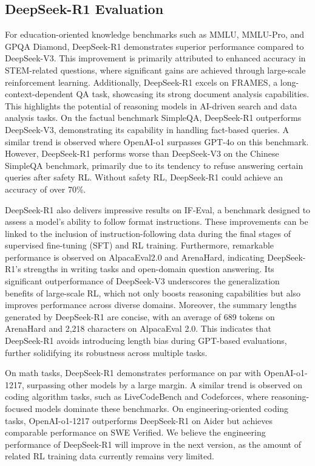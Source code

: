 \documentclass[11pt, a4paper, logo, copyright, nonumbering]{deepseek}
\newcommand{\dsri}{DeepSeek-R1}
\begin{document}
{\subsection{\dsri{} Evaluation}


For education-oriented knowledge benchmarks such as MMLU, MMLU-Pro, and GPQA Diamond, \dsri{} demonstrates superior performance compared to DeepSeek-V3. This improvement is primarily attributed to enhanced accuracy in STEM-related questions, where significant gains are achieved through large-scale reinforcement learning. Additionally, \dsri{} excels on FRAMES, a long-context-dependent QA task, showcasing its strong document analysis capabilities. This highlights the potential of reasoning models in AI-driven search and data analysis tasks. On the factual benchmark SimpleQA, \dsri{} outperforms DeepSeek-V3, demonstrating its capability in handling fact-based queries. A similar trend is observed where OpenAI-o1 surpasses GPT-4o on this benchmark. However, \dsri{} performs worse than DeepSeek-V3 on the Chinese SimpleQA benchmark, primarily due to its tendency to refuse answering certain queries after safety RL. Without safety RL, \dsri{} could achieve an accuracy of over 70\%.


\dsri{} also delivers impressive results on IF-Eval, a benchmark designed to assess a model's ability to follow format instructions. These improvements can be linked to the inclusion of instruction-following data during the final stages of supervised fine-tuning (SFT) and RL training. Furthermore, remarkable performance is observed on AlpacaEval2.0 and ArenaHard, indicating \dsri{}’s strengths in writing tasks and open-domain question answering. Its significant outperformance of DeepSeek-V3 underscores the generalization benefits of large-scale RL, which not only boosts reasoning capabilities but also improves performance across diverse domains.
Moreover, the summary lengths generated by \dsri{} are concise, with an average of 689 tokens on ArenaHard and 2,218 characters on AlpacaEval 2.0. This indicates that \dsri{} avoids introducing length bias during GPT-based evaluations, further solidifying its robustness across multiple tasks.

On math tasks, \dsri{} demonstrates performance on par with OpenAI-o1-1217, surpassing other models by a large margin. A similar trend is observed on coding algorithm tasks, such as LiveCodeBench and Codeforces, where reasoning-focused models dominate these benchmarks. On engineering-oriented coding tasks, OpenAI-o1-1217 outperforms \dsri{} on Aider but achieves comparable performance on SWE Verified. We believe the engineering performance of \dsri{} will improve in the next version, as the amount of related RL training data currently remains very limited.


}
\end{document}

